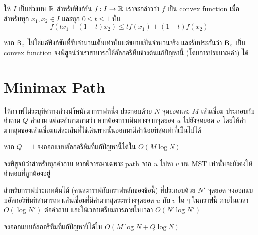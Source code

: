 \begin{bonus}
ให้ $I$ เป็นช่วงบน $\mathbb{R}$ สำหรับฟังก์ชัน $f \colon I \to \mathbb{R}$ เราจะกล่าวว่า $f$ เป็น convex function เมื่อสำหรับทุก $x_1, x_2 \in I$ และทุก $0 \leq t \leq 1$ นั้น
\[
f(tx_1 + (1-t)x_2) \leq tf(x_1) + (1-t)f(x_2)
\]

หาก $\mathsf{B}_x$ ไม่ใช่แค่ฟังก์ชันที่รับจำนวนเต็มเท่านั้นแต่ขยายเป็นจำนวนจริง และรับประกันว่า $\mathsf{B}_x$ เป็น convex function จงพิสูจน์ว่าเราสามารถใช้อัลกอริทึมข้างต้นแก้ปัญหานี้ (โดยการประมาณค่า) ได้
\end{bonus}

\section{Minimax Path}

ให้กราฟไม่ระบุทิศทางถ่วงนำ้หนักมากราฟหนึ่ง ประกอบด้วย $N$ จุดยอดและ $M$ เส้นเชื่อม ประกอบกับคำถาม $Q$ คำถาม แต่ละคำถามถามว่า หากต้องการเดินทางจากจุดยอด $u$ ไปยังจุดยอด $v$ โดยให้ค่ามากสุดของเส้นเชื่อมแต่ละเส้นที่ใช้เดินทางนั้นออกมามีค่าน้อยที่สุดเท่าที่เป็นไปได้

\begin{exercise}
หาก $Q = 1$ จงออกแบบอัลกอริทึมที่แก้ปัญหานี้ได้ใน $O(M \log N)$
\end{exercise}

\begin{exercise}
จงพิสูจน์ว่าสำหรับทุกคำถาม หากพิจารณาเฉพาะ path จาก $u$ ไปหา $v$ บน MST เท่านั้นจะยังคงให้คำตอบที่ถูกต้องอยู่
\end{exercise}

\begin{exercise}
สำหรับกราฟประเภทต้นไม้ (คนละกราฟกับกราฟหลักของข้อนี้) ที่ประกอบด้วย $N'$ จุดยอด จงออกแบบอัลกอริทึมที่สามารถหาเส้นเชื่อมที่มีค่ามากสุดระหว่างจุดยอด $u$ กับ $v$ ใด ๆ ในกราฟนี้ ภายในเวลา $O(\log N')$ ต่อคำถาม และให้เวลาเตรียมการภายในเวลา $O(N' \log N')$
\end{exercise}

\begin{exercise}
จงออกแบบอัลกอริทึมที่แก้ปัญหานี้ได้ใน $O(M \log N + Q \log N)$
\end{exercise}